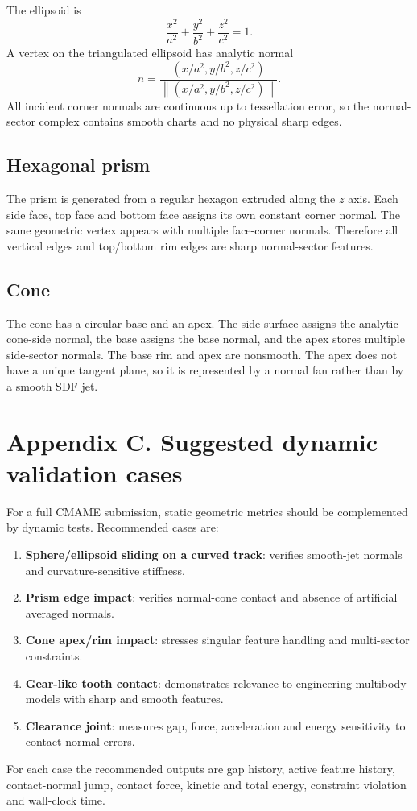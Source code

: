 \documentclass[preprint,12pt,sort&compress]{elsarticle}
\newcommand{\norm}[1]{\left\lVert #1 \right\rVert}
\begin{document}
The ellipsoid is
\begin{equation}
 \frac{x^2}{a^2}+\frac{y^2}{b^2}+\frac{z^2}{c^2}=1.
\end{equation}
A vertex on the triangulated ellipsoid has analytic normal
\begin{equation}
 n = \frac{(x/a^2,y/b^2,z/c^2)}{\norm{(x/a^2,y/b^2,z/c^2)}}.
\end{equation}
All incident corner normals are continuous up to tessellation error, so the normal-sector complex contains smooth charts and no physical sharp edges.

\subsection{Hexagonal prism}

The prism is generated from a regular hexagon extruded along the $z$ axis. Each side face, top face and bottom face assigns its own constant corner normal. The same geometric vertex appears with multiple face-corner normals. Therefore all vertical edges and top/bottom rim edges are sharp normal-sector features.

\subsection{Cone}

The cone has a circular base and an apex. The side surface assigns the analytic cone-side normal, the base assigns the base normal, and the apex stores multiple side-sector normals. The base rim and apex are nonsmooth. The apex does not have a unique tangent plane, so it is represented by a normal fan rather than by a smooth SDF jet.

\section{Appendix C. Suggested dynamic validation cases}
\label{app:dynamic}

For a full CMAME submission, static geometric metrics should be complemented by dynamic tests. Recommended cases are:
\begin{enumerate}[leftmargin=1.8em]
\item \textbf{Sphere/ellipsoid sliding on a curved track}: verifies smooth-jet normals and curvature-sensitive stiffness.
\item \textbf{Prism edge impact}: verifies normal-cone contact and absence of artificial averaged normals.
\item \textbf{Cone apex/rim impact}: stresses singular feature handling and multi-sector constraints.
\item \textbf{Gear-like tooth contact}: demonstrates relevance to engineering multibody models with sharp and smooth features.
\item \textbf{Clearance joint}: measures gap, force, acceleration and energy sensitivity to contact-normal errors.
\end{enumerate}
For each case the recommended outputs are gap history, active feature history, contact-normal jump, contact force, kinetic and total energy, constraint violation and wall-clock time.



\end{document}
